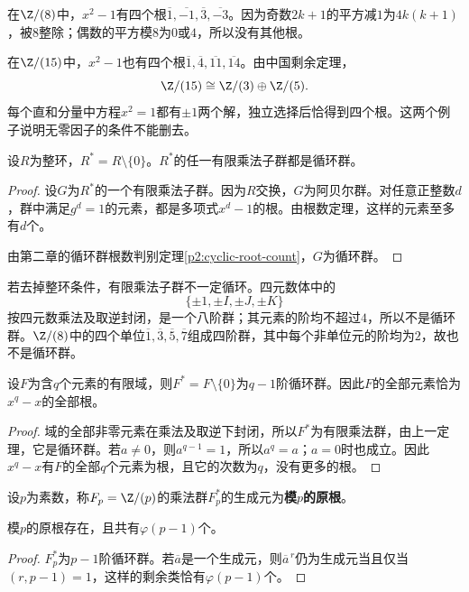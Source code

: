\begin{example}
在$\Z/(8)$中，$x^2-1$有四个根$\overline1,\overline{-1},\overline3,\overline{-3}$。因为奇数$2k+1$的平方减$1$为$4k(k+1)$，被$8$整除；偶数的平方模$8$为$0$或$4$，所以没有其他根。

在$\Z/(15)$中，$x^2-1$也有四个根$\overline1,\overline4,\overline{11},\overline{14}$。由中国剩余定理，
\[
\Z/(15)\cong\Z/(3)\oplus\Z/(5).
\]
每个直和分量中方程$x^2=1$都有$\pm1$两个解，独立选择后恰得到四个根。这两个例子说明无零因子的条件不能删去。
\end{example}

\begin{theorem}\label{p2:finite-multiplicative-subgroup}
设$R$为整环，$R^*=R\setminus\{0\}$。$R^*$的任一有限乘法子群都是循环群。
\end{theorem}
\begin{proof}
设$G$为$R^*$的一个有限乘法子群。因为$R$交换，$G$为阿贝尔群。对任意正整数$d$，群中满足$g^d=1$的元素，都是多项式$x^d-1$的根。由根数定理，这样的元素至多有$d$个。

由第二章的循环群根数判别定理\ref{p2:cyclic-root-count}，$G$为循环群。
\end{proof}

\begin{example}
若去掉整环条件，有限乘法子群不一定循环。四元数体中的
\[
\{\pm1,\pm I,\pm J,\pm K\}
\]
按四元数乘法及取逆封闭，是一个八阶群；其元素的阶均不超过$4$，所以不是循环群。$\Z/(8)$中的四个单位$\overline1,\overline3,\overline5,\overline7$组成四阶群，其中每个非单位元的阶均为$2$，故也不是循环群。
\end{example}

\begin{corollary}
设$F$为含$q$个元素的有限域，则$F^*=F\setminus\{0\}$为$q-1$阶循环群。因此$F$的全部元素恰为$x^q-x$的全部根。
\end{corollary}
\begin{proof}
域的全部非零元素在乘法及取逆下封闭，所以$F^*$为有限乘法群，由上一定理，它是循环群。若$a\ne0$，则$a^{q-1}=1$，所以$a^q=a$；$a=0$时也成立。因此$x^q-x$有$F$的全部$q$个元素为根，且它的次数为$q$，没有更多的根。
\end{proof}

\begin{definition}
设$p$为素数，称$F_p=\Z/(p)$的乘法群$F_p^*$的生成元为\textbf{模$p$的原根}。
\end{definition}

\begin{corollary}
模$p$的原根存在，且共有$\varphi(p-1)$个。
\end{corollary}
\begin{proof}
$F_p^*$为$p-1$阶循环群。若$\overline a$是一个生成元，则$\overline a^{\,r}$仍为生成元当且仅当$(r,p-1)=1$，这样的剩余类恰有$\varphi(p-1)$个。
\end{proof}

